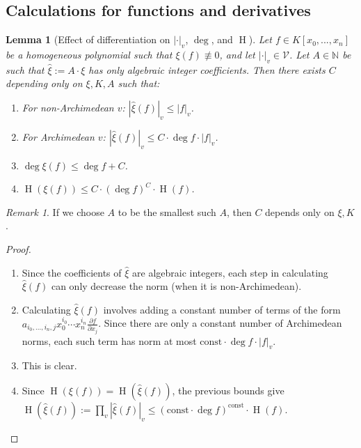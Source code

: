 \documentclass[reqno]{amsart}
\theoremstyle{plain}
\newtheorem{Lem}[Cor]{Lemma}
\theoremstyle{definition}
\theoremstyle{remark}
\newtheorem{Rem}[Cor]{Remark}
\theoremstyle{plain}
\begin{document}
\subsection{Calculations for functions and derivatives}

\begin{Lem}[Effect of differentiation on $|\cdot|_v$, $\deg$, and $\operatorname{H}$]\label{Lemma |xi(f)|_v, deg, H}
Let $f\in K[x_0,...,x_n]$ be a homogeneous polynomial such that $\xi(f)\not\equiv 0$, and let $|\cdot|_v\in\mathcal V$. Let $A\in\mathbb N$ be such that $\hat{\xi}:=A\cdot\xi$ has only algebraic integer coefficients. Then there exists $C$ depending only on $\xi,K,A$ such that:
\begin{enumerate}
\item For non-Archimedean $v$: $|\hat{\xi}(f)|_v\leq |f|_v$.
\item For Archimedean $v$: $|\hat{\xi}(f)|_v\leq C\cdot\deg f\cdot|f|_v$.
\item $\deg\xi(f)\leq\deg f+C$.
\item $\operatorname{H}(\xi(f))\leq C\cdot(\deg f)^C\cdot\operatorname{H}(f)$.
\end{enumerate}
\end{Lem}

\begin{Rem}
If we choose $A$ to be the smallest such $A$, then $C$ depends only on $\xi,K$.
\end{Rem}

\begin{proof}
\hfill
\begin{enumerate}
\item Since the coefficients of $\hat{\xi}$ are algebraic integers, each step in calculating $\hat{\xi}(f)$ can only decrease the norm (when it is non-Archimedean).
\item Calculating $\hat{\xi}(f)$ involves adding a constant number of terms of the form $a_{i_0,...,i_n,j}x_0^{i_0}\cdots x_n^{i_n}\frac{\partial f}{\partial x_j}$. Since there are only a constant number of Archimedean norms, each such term has norm at most $\mathrm{const}\cdot\deg f\cdot|f|_v$.
\item This is clear.
\item Since $\operatorname{H}(\xi(f))=\operatorname{H}(\hat{\xi}(f))$, the previous bounds give $\operatorname{H}(\hat{\xi}(f)):=\prod_v|\hat{\xi}(f)|_v\leq(\mathrm{const}\cdot\deg f)^\mathrm{const}\cdot\operatorname{H}(f)$.
\end{enumerate}
\end{proof}
\end{document}

